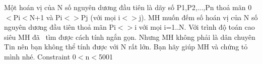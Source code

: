 Một hoán vị của N số nguyên dương đầu tiên là dãy số P1,P2,...,Pn thoả mãn 0$<$Pi$<$N+1 và Pi$<$$>$Pj (với mọi i$<$$>$j). MH muốn đếm số hoán vị của N số nguyên dương đầu tiên thoả mãn Pi$<$$>$i với mọi i=1..N. Với trình độ toán cao siêu MH đã  tìm được cách tính ngắn gọn. Nhưng MH không phải là dân chuyên Tin nên bạn không thể tính được với N rất lớn. Bạn hãy giúp MH và chứng tỏ mình nhé.
   Constraint  
0$<$n$<$5001